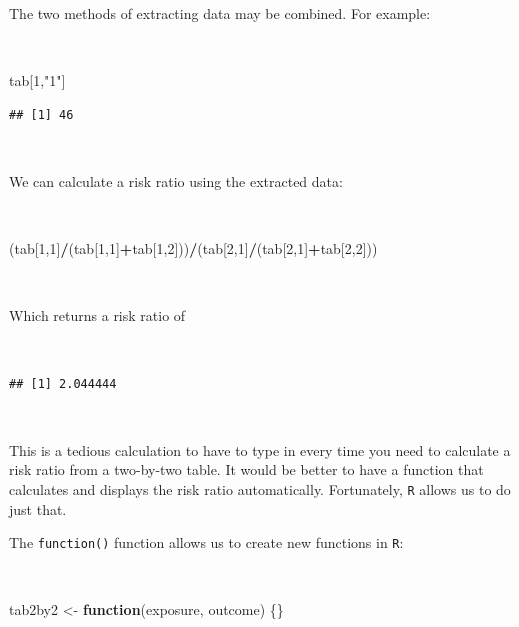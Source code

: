 \documentclass[12pt,a4paper]{book}
\newenvironment{Shaded}{\begin{snugshade}}{\end{snugshade}}
\newcommand{\ControlFlowTok}[1]{\textcolor[rgb]{0.13,0.29,0.53}{\textbf{#1}}}
\newcommand{\DecValTok}[1]{\textcolor[rgb]{0.00,0.00,0.81}{#1}}
\newcommand{\NormalTok}[1]{#1}
\newcommand{\OperatorTok}[1]{\textcolor[rgb]{0.81,0.36,0.00}{\textbf{#1}}}
\newcommand{\StringTok}[1]{\textcolor[rgb]{0.31,0.60,0.02}{#1}}
\theoremstyle{definition}
\theoremstyle{definition}
\theoremstyle{definition}
\theoremstyle{remark}
\begin{document}
\newpage

The two methods of extracting data may be combined. For example:

~

\begin{Shaded}
\begin{Highlighting}[]
\NormalTok{tab[}\DecValTok{1}\NormalTok{,}\StringTok{"1"}\NormalTok{]}
\end{Highlighting}
\end{Shaded}

\begin{verbatim}
## [1] 46
\end{verbatim}

~

We can calculate a risk ratio using the extracted data:

~

\begin{Shaded}
\begin{Highlighting}[]
\NormalTok{(tab[}\DecValTok{1}\NormalTok{,}\DecValTok{1}\NormalTok{]}\OperatorTok{/}\NormalTok{(tab[}\DecValTok{1}\NormalTok{,}\DecValTok{1}\NormalTok{]}\OperatorTok{+}\NormalTok{tab[}\DecValTok{1}\NormalTok{,}\DecValTok{2}\NormalTok{]))}\OperatorTok{/}\NormalTok{(tab[}\DecValTok{2}\NormalTok{,}\DecValTok{1}\NormalTok{]}\OperatorTok{/}\NormalTok{(tab[}\DecValTok{2}\NormalTok{,}\DecValTok{1}\NormalTok{]}\OperatorTok{+}\NormalTok{tab[}\DecValTok{2}\NormalTok{,}\DecValTok{2}\NormalTok{]))}
\end{Highlighting}
\end{Shaded}

~

Which returns a risk ratio of

~

\begin{verbatim}
## [1] 2.044444
\end{verbatim}

~

This is a tedious calculation to have to type in every time you need to
calculate a risk ratio from a two-by-two table. It would be better to
have a function that calculates and displays the risk ratio
automatically. Fortunately, \texttt{R} allows us to do just that.

The \texttt{function()} function allows us to create new functions in
\texttt{R}:

~

\begin{Shaded}
\begin{Highlighting}[]
\NormalTok{tab2by2 <-}\StringTok{ }\ControlFlowTok{function}\NormalTok{(exposure, outcome) \{\}}
\end{Highlighting}
\end{Shaded}
\end{document}
